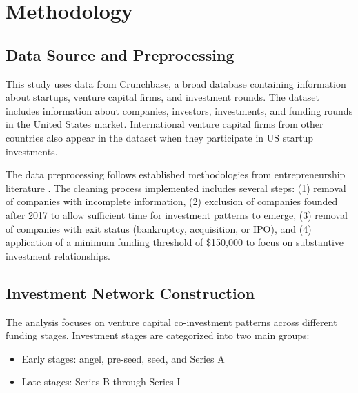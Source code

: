 \section{Methodology}

\subsection{Data Source and Preprocessing}

This study uses data from Crunchbase, a broad database containing information about startups, venture capital firms, and investment rounds. The dataset includes information about companies, investors, investments, and funding rounds in the United States market. International venture capital firms from other countries also appear in the dataset when they participate in US startup investments.

The data preprocessing follows established methodologies from entrepreneurship literature \cite{Dalle2025}. The cleaning process implemented includes several steps: (1) removal of companies with incomplete information, (2) exclusion of companies founded after 2017 to allow sufficient time for investment patterns to emerge, (3) removal of companies with exit status (bankruptcy, acquisition, or IPO), and (4) application of a minimum funding threshold of \$150,000 to focus on substantive investment relationships.



\subsection{Investment Network Construction}

The analysis focuses on venture capital co-investment patterns across different funding stages. Investment stages are categorized into two main groups:
\begin{itemize}
    \item Early stages: angel, pre-seed, seed, and Series A
    \item Late stages: Series B through Series I
\end{itemize}

